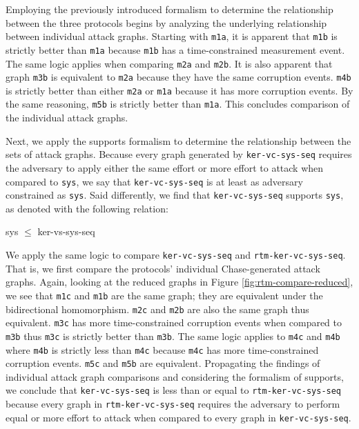 \documentclass[runningheads]{llncs}
\theoremstyle{definition}
\begin{document}
\newpage

Employing the previously introduced formalism to determine the relationship between the three protocols begins by analyzing the underlying relationship between individual attack graphs. Starting with \texttt{m1a}, it is apparent that \texttt{m1b} is strictly better than \texttt{m1a} because \texttt{m1b} has a time-constrained measurement event. The same logic applies when comparing \texttt{m2a} and \texttt{m2b}. It is also apparent that graph \texttt{m3b} is equivalent to \texttt{m2a} because they have the same corruption events. \texttt{m4b} is strictly better than either \texttt{m2a} or \texttt{m1a} because it has more corruption events. By the same reasoning, \texttt{m5b} is strictly better than \texttt{m1a}. This concludes comparison of the individual attack graphs.

Next, we apply the supports formalism to determine the relationship between the sets of attack graphs. Because every graph generated by \texttt{ker-vc-sys-seq} requires the adversary to apply either the same effort or more effort to attack when compared to \texttt{sys}, we say that \texttt{ker-vc-sys-seq} is at least as adversary constrained as \texttt{sys}. Said differently, we find that \texttt{ker-vc-sys-seq} supports \texttt{sys}, as denoted with the following relation: 

\begin{center}
    sys $\leq$ ker-vs-sys-seq
\end{center}

We apply the same logic to compare \texttt{ker-vc-sys-seq} and \texttt{rtm-ker-vc-sys-seq}. That is, we first compare the protocols' individual Chase-generated attack graphs. Again, looking at the reduced graphs in Figure \ref{fig:rtm-compare-reduced}, we see that  \texttt{m1c} and  \texttt{m1b} are the same graph; they are equivalent under the bidirectional homomorphism. \texttt{m2c} and \texttt{m2b} are also the same graph thus equivalent. \texttt{m3c} has more time-constrained corruption events when compared to  \texttt{m3b} thus  \texttt{m3c} is strictly better than \texttt{m3b}. The same logic applies to \texttt{m4c} and  \texttt{m4b} where  \texttt{m4b} is strictly less than  \texttt{m4c} because  \texttt{m4c} has more time-constrained corruption events.  \texttt{m5c} and \texttt{m5b} are equivalent. Propagating the findings of individual attack graph comparisons and considering the formalism of supports, we conclude that \texttt{ker-vc-sys-seq} is less than or equal to \texttt{rtm-ker-vc-sys-seq} because every graph in \texttt{rtm-ker-vc-sys-seq} requires the adversary to perform equal or more effort to attack when compared to every graph in  \texttt{ker-vc-sys-seq}. 
\end{document}
